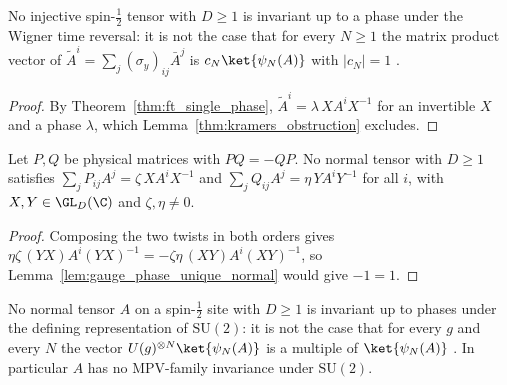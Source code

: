 \begin{lemma}
    \label{thm:kramers_obstruction_phase}
    \leanok
    No injective spin-$\tfrac12$ tensor with $D\ge1$ is invariant up to a phase
    under the Wigner time reversal: it is not the case that for every $N\ge1$ the
    matrix product vector of $\tilde A^i=\sum_j(\sigma_y)_{ij}\bar A^j$ is
    $c_N\ket{\psi_N(A)}$ with $|c_N|=1$ \cite[Section~III.A]{Cirac2021Matrix}.
\end{lemma}

\begin{proof}\leanok
    By Theorem~\ref{thm:ft_single_phase}, $\tilde A^i=\lambda\,XA^iX^{-1}$ for an
    invertible $X$ and a phase $\lambda$, which Lemma~\ref{thm:kramers_obstruction}
    excludes.
\end{proof}

\begin{lemma}
    \label{thm:anticommuting_physical_obstruction}
    \leanok
    Let $P,Q$ be physical matrices with $PQ=-QP$.  No normal tensor with $D\ge1$
    satisfies $\sum_jP_{ij}A^j=\zeta\,XA^iX^{-1}$ and
    $\sum_jQ_{ij}A^j=\eta\,YA^iY^{-1}$ for all $i$, with $X,Y\in\GL_{D}(\C)$ and
    $\zeta,\eta\neq0$.
\end{lemma}

\begin{proof}\leanok
    Composing the two twists in both orders gives
    $\eta\zeta\,(YX)A^i(YX)^{-1}=-\zeta\eta\,(XY)A^i(XY)^{-1}$, so
    Lemma~\ref{lem:gauge_phase_unique_normal} would give $-1=1$.
\end{proof}

\begin{lemma}
    \label{thm:spin_half_su2_obstruction}
    \leanok
    No normal tensor $A$ on a spin-$\tfrac12$ site with $D\ge1$ is invariant up to
    phases under the defining representation of $\mathrm{SU}(2)$: it is not the
    case that for every $g$ and every $N$ the vector $U(g)^{\otimes N}\ket{\psi_N(A)}$
    is a multiple of $\ket{\psi_N(A)}$ \cite[Section~III.A]{Cirac2021Matrix}.  In
    particular $A$ has no MPV-family invariance under $\mathrm{SU}(2)$.
\end{lemma}

